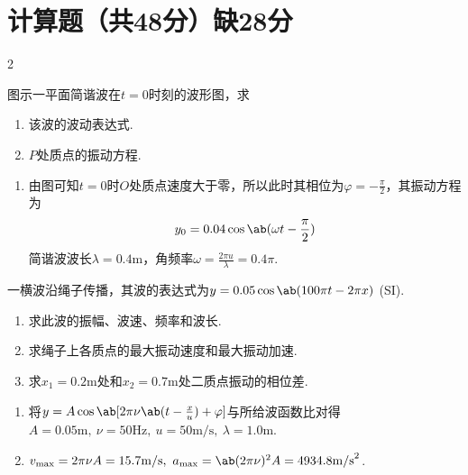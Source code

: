\section{计算题（共48分）\scriptsize 缺28分}
{
\begin{paracol}{2}
\begin{exercise}[10]{}
    图示一平面简谐波在$t=0$时刻的波形图，求
\begin{enumerate}
    \item 该波的波动表达式.
    \item $P$处质点的振动方程.
\end{enumerate}
\end{exercise}
\end{paracol}
\begin{solution}
\begin{enumerate}
    \item 由图可知$t=0$时$O$处质点速度大于零，所以此时其相位为$\varphi=-\frac{\pi}{2}$，其振动方程为
    $$y_0=0.04\cos{\ab(\omega t-\frac{\pi}{2})}$$
    简谐波波长$\lambda=0.4\mathrm{m}$，角频率$\omega=\frac{2\pi u}{\lambda}=0.4\pi$.
\end{enumerate}
\end{solution}

\begin{exercise}[10]{}
    一横波沿绳子传播，其波的表达式为$y=0.05\cos{\ab(100\pi t-2\pi x)}$ (SI).
\begin{enumerate}
    \item 求此波的振幅、波速、频率和波长.
    \item 求绳子上各质点的最大振动速度和最大振动加速.
    \item 求$x_1=0.2\mathrm{m}$处和$x_2=0.7\mathrm{m}$处二质点振动的相位差.
\end{enumerate}
\end{exercise}
\begin{solution}
\begin{enumerate}
    \item 将$y=A\cos{\ab[2\pi\nu\ab(t-\frac{x}{u})+\varphi]}$与所给波函数比对得$A=0.05\mathrm{m},\ \nu=50\mathrm{Hz},\ u=50\mathrm{m/s},\ \lambda=1.0\mathrm{m}$.
    \item $v_{\max}=2\pi\nu A=15.7\mathrm{m/s},\ a_{\max}=\ab(2\pi\nu)^2A=4934.8\mathrm{m/s}^2$.
\end{enumerate}
\end{solution}
}